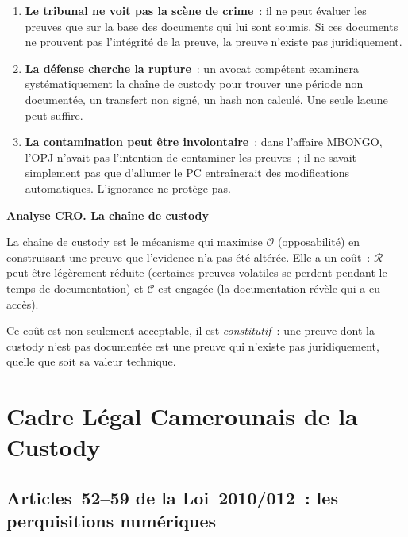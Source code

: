 \begin{enumerate}
    \item \textbf{Le tribunal ne voit pas la scène de crime}~: il ne peut
          évaluer les preuves que sur la base des documents qui lui sont
          soumis. Si ces documents ne prouvent pas l'intégrité de la preuve,
          la preuve n'existe pas juridiquement.
    \item \textbf{La défense cherche la rupture}~: un avocat compétent
          examinera systématiquement la chaîne de custody pour trouver
          une période non documentée, un transfert non signé, un hash
          non calculé. Une seule lacune peut suffire.
    \item \textbf{La contamination peut être involontaire}~: dans l'affaire
          MBONGO, l'OPJ n'avait pas l'intention de contaminer les preuves~;
          il ne savait simplement pas que d'allumer le PC entraînerait
          des modifications automatiques. L'ignorance ne protège pas.
\end{enumerate}

\begin{boxCRO}
\textbf{Analyse CRO. La chaîne de custody}

La chaîne de custody est le mécanisme qui maximise $\mathcal{O}$
(opposabilité) en construisant une preuve que l'evidence n'a pas été
altérée. Elle a un coût~: $\mathcal{R}$ peut être légèrement réduite
(certaines preuves volatiles se perdent pendant le temps de documentation)
et $\mathcal{C}$ est engagée (la documentation révèle qui a eu accès).

Ce coût est non seulement acceptable, il est \emph{constitutif}~: une preuve
dont la custody n'est pas documentée est une preuve qui n'existe pas
juridiquement, quelle que soit sa valeur technique.

\end{boxCRO}

\section{Cadre Légal Camerounais de la Custody}
\label{sec:custody-legal}

\subsection{Articles~52--59 de la Loi~2010/012~: les perquisitions numériques}

